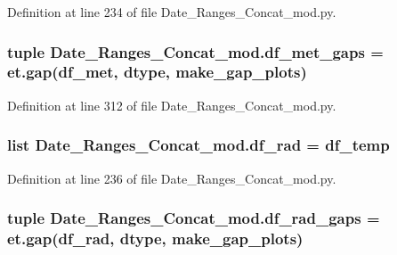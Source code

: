 Definition at line 234 of file Date\+\_\+\+Ranges\+\_\+\+Concat\+\_\+mod.\+py.

\hypertarget{namespace_date___ranges___concat__mod_ada8b37577d4316cf76fa314175afa416}{}
\subsubsection[{df\+\_\+met\+\_\+gaps}]{\setlength{\rightskip}{0pt plus 5cm}tuple Date\+\_\+\+Ranges\+\_\+\+Concat\+\_\+mod.\+df\+\_\+met\+\_\+gaps = et.\+gap({\bf df\+\_\+met}, {\bf dtype}, {\bf make\+\_\+gap\+\_\+plots})}\label{namespace_date___ranges___concat__mod_ada8b37577d4316cf76fa314175afa416}


Definition at line 312 of file Date\+\_\+\+Ranges\+\_\+\+Concat\+\_\+mod.\+py.

\hypertarget{namespace_date___ranges___concat__mod_a6d12de17d0b5d91bd919ac922e2929bd}{}
\subsubsection[{df\+\_\+rad}]{\setlength{\rightskip}{0pt plus 5cm}list Date\+\_\+\+Ranges\+\_\+\+Concat\+\_\+mod.\+df\+\_\+rad = {\bf df\+\_\+temp}}\label{namespace_date___ranges___concat__mod_a6d12de17d0b5d91bd919ac922e2929bd}


Definition at line 236 of file Date\+\_\+\+Ranges\+\_\+\+Concat\+\_\+mod.\+py.

\hypertarget{namespace_date___ranges___concat__mod_a19769e89a29780f0584f7c59199f48d3}{}
\subsubsection[{df\+\_\+rad\+\_\+gaps}]{\setlength{\rightskip}{0pt plus 5cm}tuple Date\+\_\+\+Ranges\+\_\+\+Concat\+\_\+mod.\+df\+\_\+rad\+\_\+gaps = et.\+gap({\bf df\+\_\+rad}, {\bf dtype}, {\bf make\+\_\+gap\+\_\+plots})}\label{namespace_date___ranges___concat__mod_a19769e89a29780f0584f7c59199f48d3}



